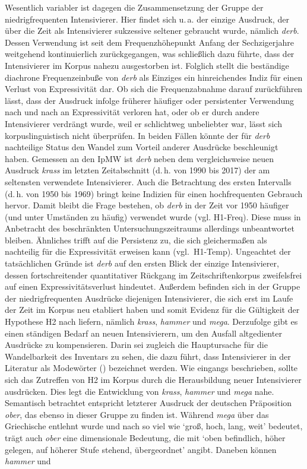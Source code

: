 Wesentlich variabler ist dagegen die Zusammensetzung der Gruppe der niedrigfrequenten Intensivierer. Hier findet sich u.\,a. der einzige Ausdruck, der über die Zeit als Intensivierer sukzessive seltener gebraucht wurde, nämlich \textit{derb}. Dessen Verwendung ist seit dem Frequenzhöhepunkt Anfang der Sechzigerjahre weitgehend kontinuierlich zurückgegangen, was schließlich dazu führte, dass der Intensivierer im Korpus nahezu ausgestorben ist. Folglich stellt die beständige diachrone Frequenzeinbuße von \textit{derb} als Einziges ein hinreichendes Indiz für einen Verlust von Expressivität dar. Ob sich die Frequenzabnahme darauf zurückführen lässt, dass der Ausdruck infolge früherer häufiger oder persistenter Verwendung nach und nach an Expressivität verloren hat, oder ob er durch andere Intensivierer verdrängt wurde, weil er schlichtweg unbeliebter war, lässt sich korpuslinguistisch nicht überprüfen. In beiden Fällen könnte der für \textit{derb} nachteilige Status den Wandel zum Vorteil anderer Ausdrücke beschleunigt haben. Gemessen an den IpMW ist \textit{derb} neben dem vergleichsweise neuen Ausdruck \textit{krass} im letzten Zeitabschnitt (d.\,h. von 1990 bis 2017) der am seltensten verwendete Intensivierer. Auch die Betrachtung des ersten Intervalls (d.\,h. von 1950 bis 1969) bringt keine Indizien für einen hochfrequenten Gebrauch hervor. Damit bleibt die Frage bestehen, ob \textit{derb} in der Zeit vor 1950 häufiger (und unter Umständen zu häufig) verwendet wurde (vgl. H1-Freq). Diese muss in Anbetracht des beschränkten Untersuchungszeitraums allerdings unbeantwortet bleiben. Ähnliches trifft auf die Persistenz zu, die sich gleichermaßen als nachteilig für die Expressivität erweisen kann \mbox{(vgl. H1-Temp)}. Ungeachtet der tatsächlichen Gründe ist \textit{derb} auf den ersten Blick der einzige Intensivierer, dessen fortschreitender quantitativer Rückgang im Zeitschriftenkorpus zweifelsfrei auf einen Expressivitätsverlust hindeutet. Außerdem befinden sich in der Gruppe der niedrigfrequenten Ausdrücke diejenigen Intensivierer, die sich erst im Laufe der Zeit im Korpus neu etabliert haben und somit Evidenz für die Gültigkeit der Hypothese H2 nach \citet[274]{Baumgarten.1908} liefern, nämlich \textit{krass}, \textit{hammer} und \textit{mega}. Derzufolge gibt es einen ständigen Bedarf an neuen Intensivierern, um den Ausfall altgedienter Ausdrücke zu kompensieren. Darin sei zugleich die Hauptursache für die Wandelbarkeit des Inventars zu sehen, die dazu führt, dass Intensivierer in der Literatur als \glqq{}Modewörter\grqq{} (\citealt[267]{Becher.1907}) bezeichnet werden. Wie eingangs beschrieben, sollte sich das Zutreffen von H2 im Korpus durch die Herausbildung neuer Intensivierer ausdrücken. Dies legt die Entwicklung von \textit{krass}, \textit{hammer} und \textit{mega} nahe. Semantisch betrachtet entspricht letzterer Ausdruck der deutschen Präposition \textit{ober}, das ebenso in dieser Gruppe zu finden ist. Während \textit{mega} über das Griechische entlehnt wurde und nach \mbox{\citet[855]{Pfeifer.1995}} so viel wie `groß, hoch, lang, weit' bedeutet, trägt auch \textit{ober} eine dimensionale Bedeutung, die \mbox{\citet[940]{Pfeifer.1995}} mit `oben befindlich, höher gelegen, auf höherer Stufe stehend, übergeordnet' angibt. Daneben können \textit{hammer} und 